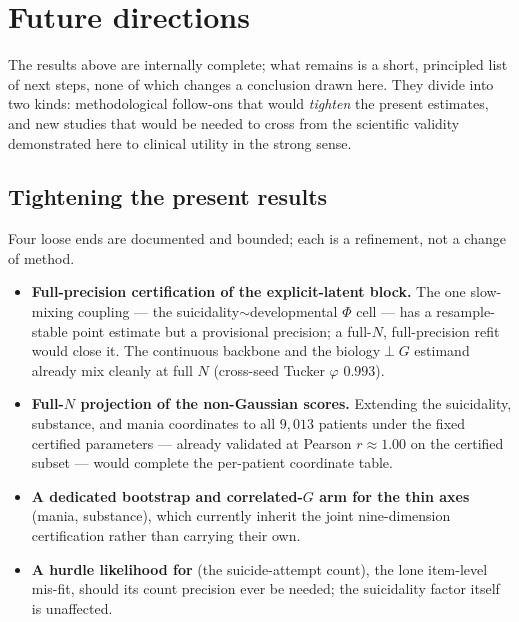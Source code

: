 \section{Future directions}
\label{sec:roadmap}

The results above are internally complete; what remains is a short, principled list of next steps, none of
which changes a conclusion drawn here. They divide into two kinds: methodological follow-ons that would
\emph{tighten} the present estimates, and new studies that would be needed to cross from the scientific
validity demonstrated here to clinical utility in the strong sense.

\subsection{Tightening the present results}
Four loose ends are documented and bounded; each is a refinement, not a change of method.
\begin{itemize}\setlength{\itemsep}{1pt}
  \item \textbf{Full-precision certification of the explicit-latent block.} The one slow-mixing coupling ---
  the suicidality$\sim$developmental $\Phi$ cell --- has a resample-stable point estimate but a provisional
  precision; a full-$N$, full-precision refit would close it. The continuous backbone and the
  biology$\perp G$ estimand already mix cleanly at full $N$ (cross-seed Tucker $\varphi$ $0.993$).
  \item \textbf{Full-$N$ projection of the non-Gaussian scores.} Extending the suicidality, substance, and
  mania coordinates to all $9{,}013$ patients under the fixed certified parameters --- already validated at
  Pearson $r\approx1.00$ on the certified subset --- would complete the per-patient coordinate table.
  \item \textbf{A dedicated bootstrap and correlated-$G$ arm for the thin axes} (mania, substance), which
  currently inherit the joint nine-dimension certification rather than carrying their own.
  \item \textbf{A hurdle likelihood for } (the suicide-attempt count), the lone item-level
  mis-fit, should its count precision ever be needed; the suicidality factor itself is unaffected.
\end{itemize}

